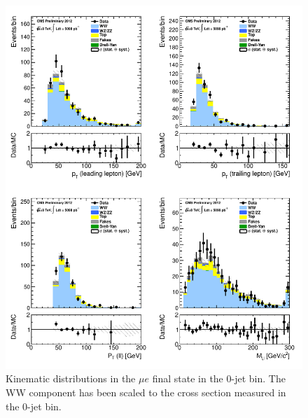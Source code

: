 \begin{figure}[!hbtp]
\centering
\includegraphics[width=1\textwidth]{figures/ww_analysis20_0_ALL_me_0j.pdf} %
\caption{Kinematic distributions in the $\mu e$ final state in the 0-jet bin.
The WW component has been scaled to the cross section measured in the 0-jet bin.}
\label{fig:xs_kinematics_me_0j}
\end{figure}
